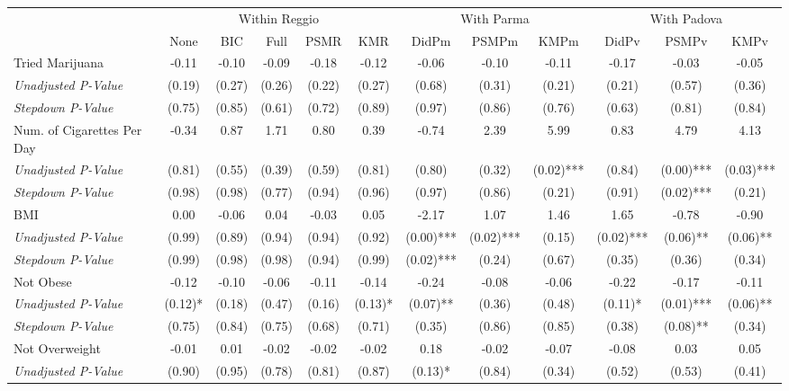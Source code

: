 \begin{tabular}{l c c c c c c c c c c c}
\toprule
& \multicolumn{5}{c}{Within Reggio} & \multicolumn{3}{c}{With Parma} & \multicolumn{3}{c}{With Padova} \\\cmidrule(lr){2-6} \cmidrule(lr){7-9} \cmidrule(lr){10-12}
 & None & BIC & Full & PSMR & KMR & DidPm & PSMPm & KMPm & DidPv & PSMPv & KMPv \\
\midrule
Tried Marijuana & -0.11 & -0.10 & -0.09 & -0.18 & -0.12 & -0.06 & -0.10 & -0.11 & -0.17 & -0.03 & -0.05 \\
\quad \textit{Unadjusted P-Value} & (0.19) & (0.27) & (0.26) & (0.22) & (0.27) & (0.68) & (0.31) & (0.21) & (0.21) & (0.57) & (0.36) \\
\quad \textit{Stepdown P-Value} & (0.75) & (0.85) & (0.61) & (0.72) & (0.89) & (0.97) & (0.86) & (0.76) & (0.63) & (0.81) & (0.84) \\
Num. of Cigarettes Per Day & -0.34 & 0.87 & 1.71 & 0.80 & 0.39 & -0.74 & 2.39 & 5.99 & 0.83 & 4.79 & 4.13 \\
\quad \textit{Unadjusted P-Value} & (0.81) & (0.55) & (0.39) & (0.59) & (0.81) & (0.80) & (0.32) & (0.02)*** & (0.84) & (0.00)*** & (0.03)*** \\
\quad \textit{Stepdown P-Value} & (0.98) & (0.98) & (0.77) & (0.94) & (0.96) & (0.97) & (0.86) & (0.21) & (0.91) & (0.02)*** & (0.21) \\
BMI & 0.00 & -0.06 & 0.04 & -0.03 & 0.05 & -2.17 & 1.07 & 1.46 & 1.65 & -0.78 & -0.90 \\
\quad \textit{Unadjusted P-Value} & (0.99) & (0.89) & (0.94) & (0.94) & (0.92) & (0.00)*** & (0.02)*** & (0.15) & (0.02)*** & (0.06)** & (0.06)** \\
\quad \textit{Stepdown P-Value} & (0.99) & (0.98) & (0.98) & (0.94) & (0.99) & (0.02)*** & (0.24) & (0.67) & (0.35) & (0.36) & (0.34) \\
Not Obese & -0.12 & -0.10 & -0.06 & -0.11 & -0.14 & -0.24 & -0.08 & -0.06 & -0.22 & -0.17 & -0.11 \\
\quad \textit{Unadjusted P-Value} & (0.12)* & (0.18) & (0.47) & (0.16) & (0.13)* & (0.07)** & (0.36) & (0.48) & (0.11)* & (0.01)*** & (0.06)** \\
\quad \textit{Stepdown P-Value} & (0.75) & (0.84) & (0.75) & (0.68) & (0.71) & (0.35) & (0.86) & (0.85) & (0.38) & (0.08)** & (0.34) \\
Not Overweight & -0.01 & 0.01 & -0.02 & -0.02 & -0.02 & 0.18 & -0.02 & -0.07 & -0.08 & 0.03 & 0.05 \\
\quad \textit{Unadjusted P-Value} & (0.90) & (0.95) & (0.78) & (0.81) & (0.87) & (0.13)* & (0.84) & (0.34) & (0.52) & (0.53) & (0.41) \\

\end{tabular}
